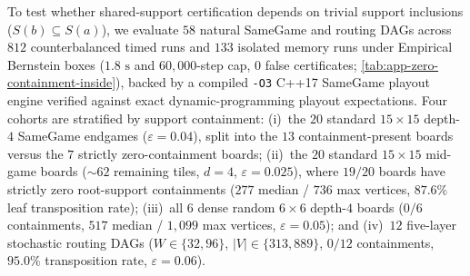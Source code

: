 \documentclass{article}
\theoremstyle{plain}
\theoremstyle{definition}
\begin{document}
To test whether shared-support certification depends on trivial support inclusions ($S(b)\subseteq S(a)$), we evaluate $58$ natural SameGame and routing DAGs across $812$ counterbalanced timed runs and $133$ isolated memory runs under Empirical Bernstein boxes ($1.8\text{ s}$ and $60{,}000$-step cap, $0$ false certificates; \cref{tab:app-zero-containment-inside}), backed by a compiled \texttt{-O3} C++17 SameGame playout engine verified against exact dynamic-programming playout expectations. Four cohorts are stratified by support containment: (i)~the $20$ standard $15\times 15$ depth-$4$ SameGame endgames ($\varepsilon=0.04$), split into the $13$ containment-present boards versus the $7$ strictly zero-containment boards; (ii)~the $20$ standard $15\times 15$ mid-game boards ($\sim 62$ remaining tiles, $d=4$, $\varepsilon=0.025$), where $19/20$ boards have strictly zero root-support containments ($277$ median / $736$ max vertices, $87.6\%$ leaf transposition rate); (iii)~all $6$ dense random $6\times 6$ depth-$4$ boards ($0/6$ containments, $517$ median / $1{,}099$ max vertices, $\varepsilon=0.05$); and (iv)~$12$ five-layer stochastic routing DAGs ($W\in\{32,96\}$, $|V|\in\{313,889\}$, $0/12$ containments, $95.0\%$ transposition rate, $\varepsilon=0.06$).
\end{document}

